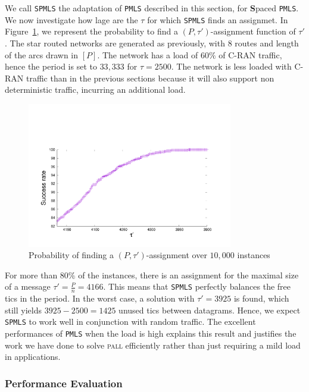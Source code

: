 \documentclass[a4paper,10pt]{article}
\newcommand\PMLS{\texttt{PMLS}\xspace}
\newcommand\SPMLS{\texttt{SPMLS}\xspace}
\newcommand\pall{\textsc{pall}\xspace}
\begin{document}
    We call \SPMLS the adaptation of \PMLS described in this section, for \textbf{S}paced \PMLS.
	We now investigate how lage are the $\tau$ for which \SPMLS finds an assignmet. In Figure~\ref{fig:spacetau}, we represent the probability to find a $(P,\tau')$-assignment function of $\tau'$.
	The star routed networks are generated as previously, with $8$ routes and length of the arcs drawn in $[P]$. The network has a load of $60\%$ of C-RAN traffic, hence the period is set to $33,333$ for $\tau = 2500$. The network is less loaded with C-RAN traffic than in the previous sections because it will also support non deterministic traffic, incurring an additional load.

    \begin{figure}
       \begin{center}
      \includegraphics[width = 0.8\textwidth]{distribtau.pdf}
      \end{center}
      \caption{Probability of finding a $(P,\tau')$-assignment over $10,000$ instances}
      \label{fig:spacetau}   
     \end{figure}   

	For more than $80\%$ of the instances, there is an assignment for the maximal size of a message $\tau' = \frac{P}{n} = 4166$. This means that \SPMLS perfectly balances the free tics in the period. In the worst case, a solution with $\tau' = 3925$ is found, which still yields $3925 - 2500 = 1425$ unused tics between datagrams. Hence, we expect \SPMLS to work well in conjunction with random traffic.
	 The excellent performances of \PMLS when the load is high explains this result and justifies the work we have done to solve \pall efficiently rather than just requiring a mild load in applications. 

    \subsubsection{Performance Evaluation}
    
\end{document}
